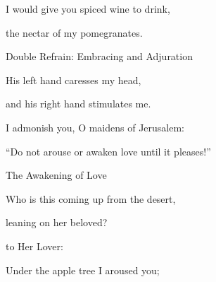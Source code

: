 {\par }{\Q I would give you spiced
wine
to drink,
\par }{\Q the nectar
of my pomegranates.
\par }{\SH Double Refrain: Embracing and Adjuration
\par }{\SH 
{}
\par }{\Q {}His left hand
caresses
my head,
\par }{\Q and his right hand
stimulates me.
\par }{\SH 
{}
\par }{\Q {}I admonish
you, O maidens
of Jerusalem:
\par }{\Q “Do
not arouse
or awaken love
until
it pleases!”
\par }{\SH The Awakening of Love
\par }{\SH 
{}
\par }{\Q {}Who
is this
coming up
from
the desert,
\par }{\Q leaning
on
her beloved?
\par }{
to Her Lover:
\par }{\Q Under
the apple tree
I aroused
you;

}
